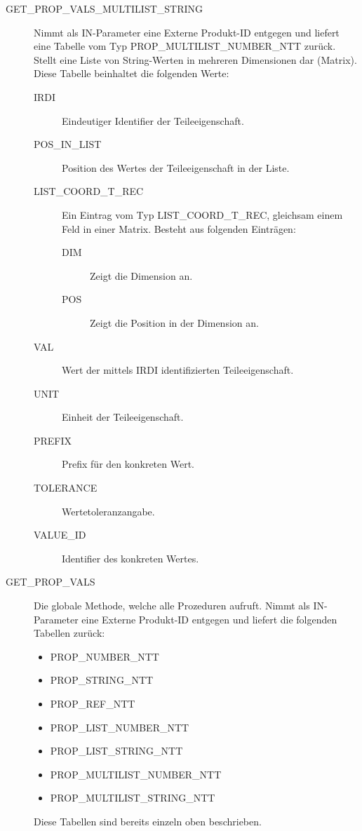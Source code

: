 \begin{description}
\item[GET\_PROP\_VALS\_MULTILIST\_STRING]  Nimmt als IN-Parameter eine Externe Produkt-ID entgegen und liefert eine Tabelle vom Typ PROP\_MULTILIST\_NUMBER\_NTT zurück. Stellt eine Liste von String-Werten in mehreren Dimensionen dar (Matrix). 
Diese Tabelle beinhaltet die folgenden Werte: 

  \begin{description}
  \item[IRDI] Eindeutiger Identifier der Teileeigenschaft.
  \item[POS\_IN\_LIST] Position des Wertes der Teileeigenschaft in der Liste.
  \item[LIST\_COORD\_T\_REC] Ein Eintrag vom Typ LIST\_COORD\_T\_REC, gleichsam einem Feld in einer Matrix. Besteht aus folgenden Einträgen:
    \begin{description}	
    \item[DIM] Zeigt die Dimension an.
    \item[POS] Zeigt die Position in der Dimension an. 
    \end{description}
  \item[VAL] Wert der mittels IRDI identifizierten Teileeigenschaft.
  \item[UNIT] Einheit der Teileeigenschaft.
  \item[PREFIX] Prefix für den konkreten Wert.
  \item[TOLERANCE] Wertetoleranzangabe.
  \item[VALUE\_ID] Identifier des konkreten Wertes.
  \end{description}
\item[GET\_PROP\_VALS] Die globale Methode, welche alle Prozeduren aufruft. Nimmt als IN-Parameter eine Externe Produkt-ID entgegen und liefert die folgenden Tabellen zurück:
\begin{itemize}
\item PROP\_NUMBER\_NTT
\item PROP\_STRING\_NTT
\item PROP\_REF\_NTT
\item PROP\_LIST\_NUMBER\_NTT
\item PROP\_LIST\_STRING\_NTT
\item PROP\_MULTILIST\_NUMBER\_NTT
\item PROP\_MULTILIST\_STRING\_NTT
\end{itemize} 

Diese Tabellen sind bereits einzeln oben beschrieben. 
\end{description}

